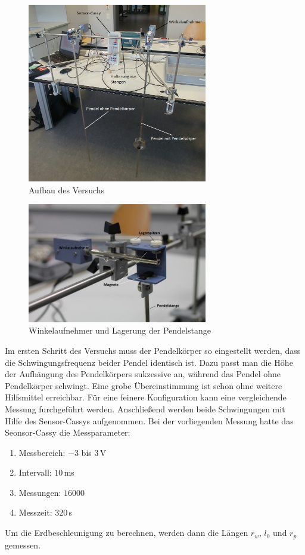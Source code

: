 \begin{figure}[H]
	\centering
	\includegraphics[width = 0.7\textwidth]{bilder/aufbaupendel1.jpg}
	\caption{Aufbau des Versuchs}\label{pic:aufbau1}
\end{figure}

\begin{figure}[H]
	\centering
	\includegraphics[width = 0.7\textwidth]{bilder/aufbaupendel2.jpg}
	\caption{Winkelaufnehmer und Lagerung der Pendelstange}\label{pic:aufbau2}
\end{figure}
Im ersten Schritt des Versuchs muss der Pendelkörper so eingestellt werden, dass die Schwingungsfrequenz beider Pendel identisch ist. Dazu passt man die Höhe der Aufhängung des Pendelkörpers sukzessive an, während das Pendel ohne Pendelkörper schwingt. Eine grobe Übereinstimmung ist schon ohne weitere Hilfsmittel erreichbar. Für eine feinere Konfiguration kann eine vergleichende Messung furchgeführt werden. Anschließend werden beide Schwingungen mit Hilfe des Sensor-Cassys aufgenommen. Bei der vorliegenden Messung hatte das Seonsor-Cassy die Messparameter:
\begin{enumerate}
\item Messbereich: $-3$ bis $3\,$V
\item Intervall: $10\,$ms
\item Messungen: $16000$
\item Messzeit: $320\,$s
\end{enumerate}
Um die Erdbeschleunigung zu berechnen, werden dann die Längen $r_w$, $l_0$ und $r_p$ gemessen.  


